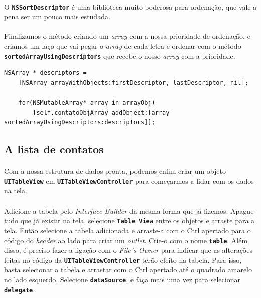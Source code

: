 \documentclass[a4paper,12pt,brazil,doubleside]{book}
\begin{document}
\paragraph{}O \texttt{\textbf{NSSortDescriptor}} é uma biblioteca muito poderosa para ordenação, que vale a pena ser um pouco mais estudada.

\pagebreak

\paragraph{}Finalizamos o método criando um \emph{array} com a nossa prioridade de ordenação, e criamos um laço que vai pegar o \emph{array} de cada letra e ordenar com o método \texttt{\textbf{sortedArrayUsingDescriptors}} que recebe o nosso \emph{array} com a prioridade.

\begin{listing}
\begin{verbatim}
NSArray * descriptors =
    [NSArray arrayWithObjects:firstDescriptor, lastDescriptor, nil];
      
    for(NSMutableArray* array in arrayObj)
        [self.contatoObjArray addObject:[array sortedArrayUsingDescriptors:descriptors]];
\end{verbatim}
\end{listing}

\bigskip

\subsection{A lista de contatos}

\paragraph{}Com a nossa estrutura de dados pronta, podemos enfim criar um objeto \texttt{\textbf{UITableView}} em \texttt{\textbf{UITableViewController}} para começarmos a lidar com os dados na tela.
\paragraph{}Adicione a tabela pelo \emph{Interface Builder} da mesma forma que já fizemos. Apague tudo que já existir na tela, selecione \texttt{\textbf{Table View}} entre os objetos e arraste para a tela. Então selecione a tabela adicionada e arraste-a com o Ctrl apertado para o código do \emph{header} ao lado para criar um \emph{outlet}. Crie-o com o nome \texttt{\textbf{table}}. Além disso, é preciso fazer a ligação com o \emph{File's Owner} para indicar que as alterações feitas no código da \texttt{\textbf{UITableViewController}} terão efeito na tabela. Para isso, basta selecionar a tabela e arrastar com o Ctrl apertado até o quadrado amarelo no lado esquerdo. Selecione \texttt{\textbf{dataSource}}, e faça mais uma vez para selecionar \texttt{\textbf{delegate}}.
\end{document}
